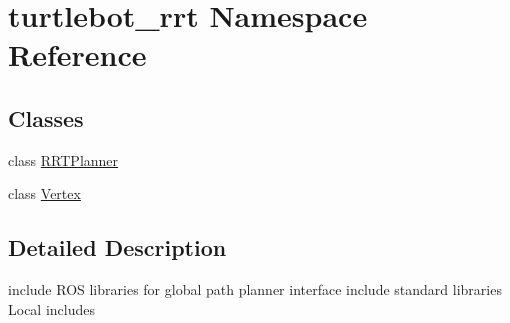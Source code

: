 \hypertarget{namespaceturtlebot__rrt}{}\section{turtlebot\+\_\+rrt Namespace Reference}
\label{namespaceturtlebot__rrt}
\subsection*{Classes}
\begin{DoxyCompactItemize}
\item 
class \hyperlink{classturtlebot__rrt_1_1RRTPlanner}{R\+R\+T\+Planner}
\item 
class \hyperlink{classturtlebot__rrt_1_1Vertex}{Vertex}
\end{DoxyCompactItemize}


\subsection{Detailed Description}
include R\+OS libraries for global path planner interface include standard libraries Local includes 